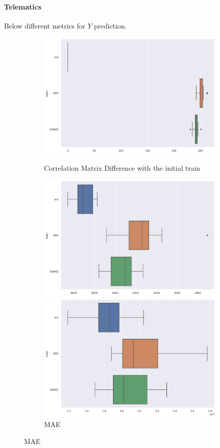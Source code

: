 \documentclass{article}
\theoremstyle{definition}
\begin{document}
\paragraph{Telematics}Below different metrics for $Y$ prediction.
\begin{figure}[H]
     \centering
     \begin{subfigure}[b]{0.49\textwidth}
         \centering
         \includegraphics[width=\textwidth]{imgs/Telematics/boxplot_MC.png}
         \caption{Correlation Matrix Difference with the initial train}
         \quad
         \includegraphics[width=\textwidth]{imgs/Telematics/boxplot_MAE.png}
         \caption{MAE}
         \quad
         \includegraphics[width=\textwidth]{imgs/Telematics/boxplot_MSE.png}

\end{subfigure}
\end{figure}
\end{document}
